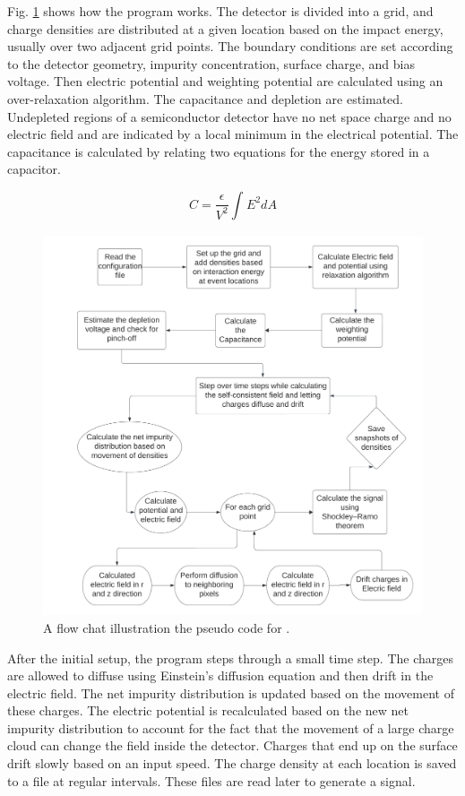 Fig. \ref{fig:ehd_flowchart} shows how the {\tdsim} program works. The detector is divided into a grid, and charge densities are distributed at a given location based on the impact energy, usually over two adjacent grid points. The boundary conditions are set according to the detector geometry, impurity concentration, surface charge, and bias voltage. Then electric potential and weighting potential are calculated using an over-relaxation algorithm. The capacitance and depletion are estimated. Undepleted regions of a semiconductor detector have no net space charge and no electric field and are indicated by a local minimum in the electrical potential. The capacitance is calculated by relating two equations for the energy stored in a capacitor.

\begin{equation}\label{capacitance_eq}
C= \frac{\epsilon}{V^2} \int_{}^{} E^2 dA
\end{equation}

\begin{figure}
\centering
\includegraphics[width=0.99\linewidth]{ch3/figs/EH Drift Flowchart.png}
\caption{A flow chat illustration the pseudo code for {\tdsim}.}
\label{fig:ehd_flowchart}
\end{figure}

After the initial setup, the program steps through a small time step. The charges are allowed to diffuse using Einstein's diffusion equation and then drift in the electric field. The net impurity distribution is updated based on the movement of these charges. The electric potential is recalculated based on the new net impurity distribution to account for the fact that the movement of a large charge cloud can change the field inside the detector. Charges that end up on the surface drift slowly based on an input speed. The charge density at each location is saved to a file at regular intervals. These files are read later to generate a signal.


